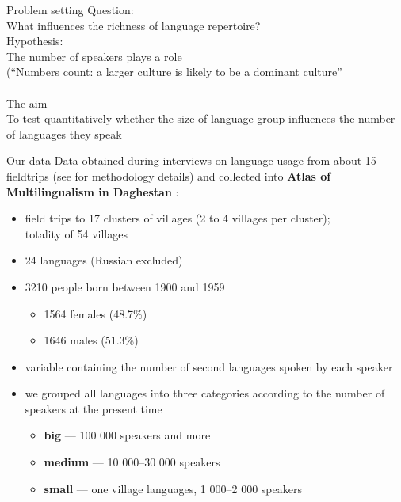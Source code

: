 \documentclass[13pt, t]{beamer}
\begin{document}
\begin{frame}{Problem setting}
\alert{Question:\\}
What influences the richness of language repertoire?\\
\vfill
\alert{Hypothesis:\\}
The number of speakers plays a role\\
(``Numbers count: a larger culture is likely to be a dominant
culture''\\
– \cite[6]{thomason01}\\
\vfill
\alert{The aim\\}
To test quantitatively whether the size of language group influences the number of languages they speak
\end{frame}

\begin{frame}{Our data}
Data obtained during interviews on language usage from about 15 fieldtrips (see \citep{dobrushina2013} for methodology details) and  collected into \textbf{Atlas of Multilingualism in Daghestan} \citep{multidagestan17}:
\begin{itemize}
\item field trips to 17 clusters of villages (2 to 4 villages per cluster); \\ totality of 54 villages
\item 24 languages \alert{(Russian excluded)} \pause
\item 3210 people born between 1900 and 1959
\begin{itemize}
\item 1564  females (48.7\%)
\item 1646 males (51.3\%)
\end{itemize}
\item variable containing the number of second languages spoken by each speaker\pause
\item we grouped all languages into three categories according to the number of speakers at the present time
\begin{itemize}
\item {\Large \color{colorbig} \textbf{big}} --- 100 000 speakers and more
\item {\Large \color{colormedium} \textbf{medium}} --- 10 000--30 000 speakers
\item {\Large \color{colorsmall} \textbf{small}} --- one village languages, 1 000--2 000 speakers
\end{itemize}
\end{itemize}
\end{frame}
\end{document}
